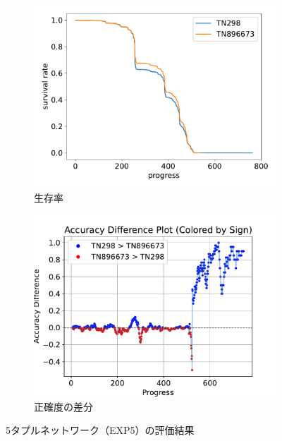 \begin{figure}[t]
\begin{subfigure}[b]{0.49\linewidth}
    \includegraphics[width=\linewidth]{pdf/compare/merged_EXP_5_NT5_OI1200_compare/survival.pdf}
    \caption{生存率}
    \label{fig:nt5_exp5_survival}
\end{subfigure}
\begin{subfigure}[b]{0.49\linewidth}
    \includegraphics[width=\linewidth]{pdf/compare/merged_EXP_5_NT5_OI1200_compare/acc_diff_plot.pdf}
    \caption{正確度の差分}
    \label{fig:nt5_exp5_acc_diff}
\end{subfigure}
\caption{5タプルネットワーク（EXP5）の評価結果}
\label{fig:nt5_exp5_results}
\end{figure}
    

